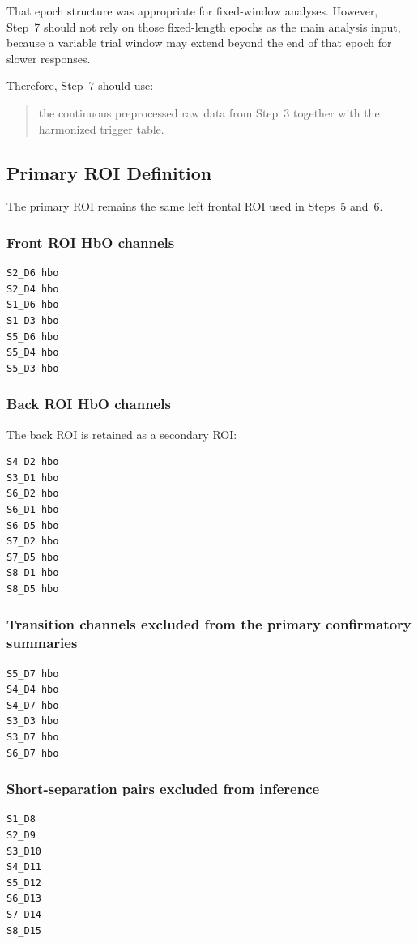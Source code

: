 That epoch structure was appropriate for fixed-window analyses.
However, Step~7 should not rely on those fixed-length epochs as the main analysis input,
because a variable trial window may extend beyond the end of that epoch for slower responses.

Therefore, Step~7 should use:
\begin{quote}
the continuous preprocessed raw data from Step~3 together with the harmonized trigger table.
\end{quote}

\subsection{Primary ROI Definition}
The primary ROI remains the same left frontal ROI used in Steps~5 and~6.

\subsubsection{Front ROI HbO channels}
\begin{verbatim}
S2_D6 hbo
S2_D4 hbo
S1_D6 hbo
S1_D3 hbo
S5_D6 hbo
S5_D4 hbo
S5_D3 hbo
\end{verbatim}

\subsubsection{Back ROI HbO channels}
The back ROI is retained as a secondary ROI:
\begin{verbatim}
S4_D2 hbo
S3_D1 hbo
S6_D2 hbo
S6_D1 hbo
S6_D5 hbo
S7_D2 hbo
S7_D5 hbo
S8_D1 hbo
S8_D5 hbo
\end{verbatim}

\subsubsection{Transition channels excluded from the primary confirmatory summaries}
\begin{verbatim}
S5_D7 hbo
S4_D4 hbo
S4_D7 hbo
S3_D3 hbo
S3_D7 hbo
S6_D7 hbo
\end{verbatim}

\subsubsection{Short-separation pairs excluded from inference}
\begin{verbatim}
S1_D8
S2_D9
S3_D10
S4_D11
S5_D12
S6_D13
S7_D14
S8_D15
\end{verbatim}

